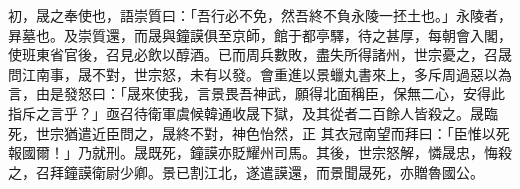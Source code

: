 \begin{pinyinscope}
 初，晟之奉使也，語崇質曰：「吾行必不免，然吾終不負永陵一抷土也。」永陵者，昪墓也。及崇質還，而晟與鐘謨俱至京師，館于都亭驛，待之甚厚，每朝會入閣，使班東省官後，召見必飲以醇酒。已而周兵數敗，盡失所得諸州，世宗憂之，召晟問江南事，晟不對，世宗怒，未有以發。會重進以景蠟丸書來上，多斥周過惡以為言，由是發怒曰：「晟來使我，言景畏吾神武，願得北面稱臣，保無二心，安得此指斥之言乎？」亟召待衛軍虞候韓通收晟下獄，及其從者二百餘人皆殺之。晟臨死，世宗猶遣近臣問之，晟終不對，神色怡然，正
 其衣冠南望而拜曰：「臣惟以死報國爾！」乃就刑。晟既死，鐘謨亦貶耀州司馬。其後，世宗怒解，憐晟忠，悔殺之，召拜鐘謨衛尉少卿。景已割江北，遂遣謨還，而景聞晟死，亦贈魯國公。



\end{pinyinscope}